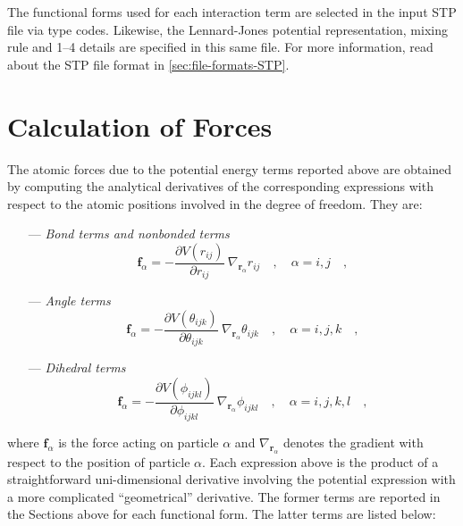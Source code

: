 \documentclass[10pt,a4paper,openany]{memoir}
\numberwithin{equation}{section}
\begin{document}
The functional forms used for each interaction term are selected in
the input STP file via type codes. Likewise, the Lennard-Jones
potential representation, mixing rule and 1--4 details are specified
in this same file. For more information, read about the STP file
format in \autoref{sec:file-formats-STP}.

\section{Calculation of Forces}
\label{sec:forces}

The atomic forces due to the potential energy terms reported above are
obtained by computing the analytical derivatives of the corresponding
expressions with respect to the atomic positions involved in the
degree of freedom. They are:

\begin{itemize}
  \item[---]\textit{Bond terms and nonbonded terms}
\begin{equation}
  \label{eq:bond-forces}
  \mathbf{f}_\alpha = -\frac{\partial V(r_{ij})}{\partial r_{ij}}\ \nabla_{\mathbf{r}_{\alpha}} r_{ij}\quad , \quad \alpha = i,j \quad ,
\end{equation}
  \item[---]\textit{Angle terms}
\begin{equation}
  \label{eq:angle-forces}
  \mathbf{f}_\alpha = -\frac{\partial V(\theta_{ijk})}{\partial \theta_{ijk}}\ \nabla_{\mathbf{r}_{\alpha}} \theta_{ijk}\quad , \quad \alpha = i,j,k \quad ,
\end{equation}
  \item[---]\textit{Dihedral terms}
\begin{equation}
  \label{eq:dihedral-forces}
  \mathbf{f}_\alpha = -\frac{\partial V(\phi_{ijkl})}{\partial \phi_{ijkl}}\ \nabla_{\mathbf{r}_{\alpha}} \phi_{ijkl}\quad , \quad \alpha = i,j,k,l \quad ,
\end{equation}
\end{itemize}
where $\mathbf{f}_\alpha$ is the force acting on particle $\alpha$ and
$\nabla_{\mathbf{r}_\alpha}$ denotes the gradient with respect to the
position of particle $\alpha$. Each expression above is the product of
a straightforward uni-dimensional derivative involving the potential
expression with a more complicated ``geometrical'' derivative. The
former terms are reported in the Sections above for each functional
form. The latter terms are listed below\cite{GROMOS-doc}:
\end{document}
